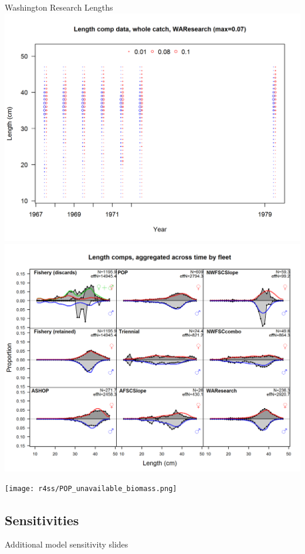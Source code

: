 \documentclass[pdf]{beamer}\usepackage[]{graphicx}\usepackage[]{color}
\begin{document}
\begin{frame}{Washington Research Lengths}
  \includegraphics[scale = 0.37]{figures/WA_research_lengths.png}
  \includegraphics[scale = 0.37]{figures/WA_research_aggregate.png}
\end{frame}

\begin{frame}
  \begin{center}
    \texttt{[image: r4ss/POP\_unavailable\_biomass.png]}
  \end{center}
\end{frame}

\subsection*{Sensitivities}
\begin{frame}
  \Huge{\centerline{Additional model sensitivity slides}}
\end{frame}
\end{document}
